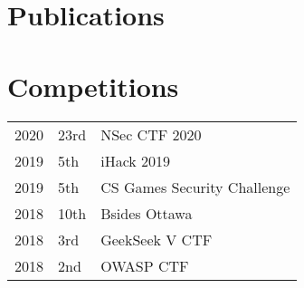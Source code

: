 \documentclass[]{deedy-resume-openfont}
\begin{document}
\begin{minipage}[t]{0.66\textwidth}

\section{Publications} 
\renewcommand\refname{\vskip -1.5em} %


\nocite{*}

\section{Competitions}

\begin{tabular}{rll}

2020      & 23rd & NSec CTF 2020\\

2019      & 5th & iHack 2019\\

2019      & 5th & CS Games Security Challenge\\

2018      & 10th & Bsides Ottawa\\

2018	     & 3rd & GeekSeek V CTF\\

2018	     & 2nd & OWASP CTF\\

\end{tabular}
\sectionsep

\end{minipage} 
\end{document}
